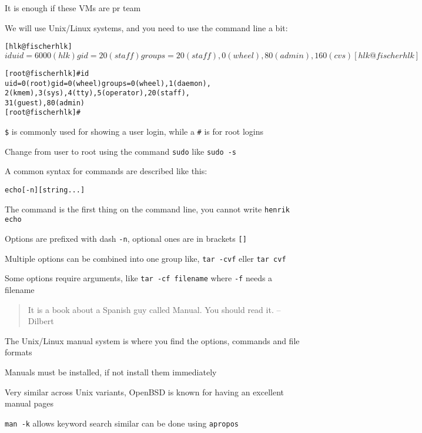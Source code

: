 \documentclass[Screen16to9,17pt]{foils}
\begin{document}
\centerline{It is enough if these VMs are pr team}




We will use Unix/Linux systems, and you need to use the command line a bit:

\begin{alltt}
\small
[hlk@fischer hlk]$ id
uid=6000(hlk) gid=20(staff) groups=20(staff),
0(wheel), 80(admin), 160(cvs)
[hlk@fischer hlk]$

[root@fischer hlk]# id
uid=0(root) gid=0(wheel) groups=0(wheel), 1(daemon),
2(kmem), 3(sys), 4(tty), 5(operator), 20(staff),
31(guest), 80(admin)
[root@fischer hlk]#
\end{alltt}

\begin{list1}
\item \verb+$+ is commonly used for showing a user login, while a \verb+#+ is for root logins
\item Change from user to root using the command \verb+sudo+ like \verb+sudo -s+
\end{list1}


A common syntax for commands are described like this:
\begin{alltt}
echo [-n] [string ...]
\end{alltt}

\begin{list2}
\item The command is the first thing on the command line, you cannot write \verb+henrik echo+
\item Options are prefixed with dash \verb+-n+, optional ones are in brackets  \verb+[]+
\item Multiple options can be combined into one group like, \verb+tar -cvf+ eller \verb+tar cvf+
\item Some options require arguments, like \verb+tar -cf filename+ where \verb+-f+ needs a filename
\end{list2}





\begin{quote}
 It is a book about a Spanish guy called Manual. You should read it.
       -- Dilbert
\end{quote}

\begin{list1}
\item The Unix/Linux manual system is where you find the options, commands and file formats
\item Manuals must be installed, if not install them immediately
\item Very similar across Unix variants, OpenBSD is known for having an excellent manual pages
\item \verb+man -k+ allows keyword search similar can be done using \verb+apropos+
\end{list1}
\end{document}

